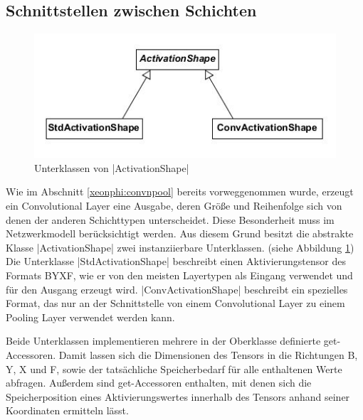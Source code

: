 \documentclass[../main.tex]{subfiles}
\begin{document}
\subsection{Schnittstellen zwischen Schichten}
\begin{figure}
	\centering 
	\includegraphics[width=\textwidth]{../images/Schmidt/cd_netdesc_actshapes.jpg} 
	\caption {Unterklassen von |ActivationShape|}
	\label{pic:cd_Netdesc_actshapes} 
\end{figure} 
Wie im Abschnitt \ref{xeonphi:convnpool} bereits vorweggenommen wurde, erzeugt ein Convolutional Layer eine Ausgabe, deren Größe und Reihenfolge sich von denen der anderen Schichttypen unterscheidet. Diese Besonderheit muss im Netzwerkmodell berücksichtigt werden. Aus diesem Grund besitzt die abstrakte Klasse |ActivationShape| zwei instanziierbare Unterklassen. (siehe Abbildung \ref{pic:cd_Netdesc_actshapes}) Die Unterklasse |StdActivationShape| beschreibt einen Aktivierungstensor des Formats BYXF, wie er von den meisten Layertypen als Eingang verwendet und für den Ausgang erzeugt wird. |ConvActivationShape| beschreibt ein spezielles Format, das nur an der Schnittstelle von einem Convolutional Layer zu einem Pooling Layer verwendet werden kann. 

Beide Unterklassen implementieren mehrere in der Oberklasse definierte get-Accessoren. Damit lassen sich die Dimensionen des Tensors in die Richtungen B, Y, X und F, sowie der tatsächliche Speicherbedarf für alle enthaltenen Werte abfragen. Außerdem sind get-Accessoren enthalten, mit denen sich die Speicherposition eines Aktivierungswertes innerhalb des Tensors anhand seiner Koordinaten ermitteln lässt. 
\end{document}
